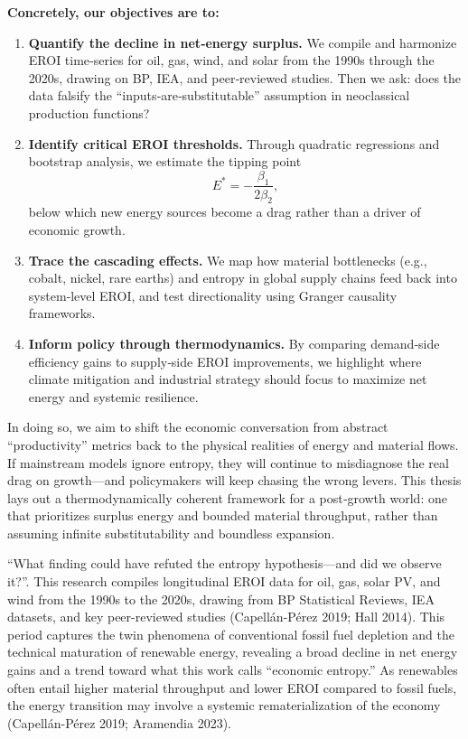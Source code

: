 \documentclass[a4paper,12pt]{article}
\begin{document}
\vspace{1em}
\noindent
\textbf{Concretely, our objectives are to:}
\begin{enumerate}
    \item \textbf{Quantify the decline in net‐energy surplus.} We compile and harmonize EROI time‐series for oil, gas, wind, and solar from the 1990s through the 2020s, drawing on BP, IEA, and peer‐reviewed studies. Then we ask: does the data falsify the “inputs‐are‐substitutable” assumption in neoclassical production functions?

    \item \textbf{Identify critical EROI thresholds.} Through quadratic regressions and bootstrap analysis, we estimate the tipping point 
    \[
        E^{\ast} = -\frac{\beta_{1}}{2\beta_{2}},
    \]
    below which new energy sources become a drag rather than a driver of economic growth.

    \item \textbf{Trace the cascading effects.} We map how material bottlenecks (e.g., cobalt, nickel, rare earths) and entropy in global supply chains feed back into system‐level EROI, and test directionality using Granger causality frameworks.

    \item \textbf{Inform policy through thermodynamics.} By comparing demand‐side efficiency gains to supply‐side EROI improvements, we highlight where climate mitigation and industrial strategy should focus to maximize net energy and systemic resilience.
\end{enumerate}

\vspace{1em}
In doing so, we aim to shift the economic conversation from abstract “productivity” metrics back to the physical realities of energy and material flows. If mainstream models ignore entropy, they will continue to misdiagnose the real drag on growth—and policymakers will keep chasing the wrong levers. This thesis lays out a thermodynamically coherent framework for a post‐growth world: one that prioritizes surplus energy and bounded material throughput, rather than assuming infinite substitutability and boundless expansion.

“What finding could have refuted the entropy hypothesis—and did we observe it?”. This research compiles longitudinal EROI data for oil, gas, solar PV, and wind from the 1990s to the 2020s, drawing from BP Statistical Reviews, IEA datasets, and key peer-reviewed studies (Capellán-Pérez 2019; Hall 2014). This period captures the twin phenomena of conventional fossil fuel depletion and the technical maturation of renewable energy, revealing a broad decline in net energy gains and a trend toward what this work calls “economic entropy.” As renewables often entail higher material throughput and lower EROI compared to fossil fuels, the energy transition may involve a systemic rematerialization of the economy (Capellán-Pérez 2019; Aramendia 2023).
\end{document}
